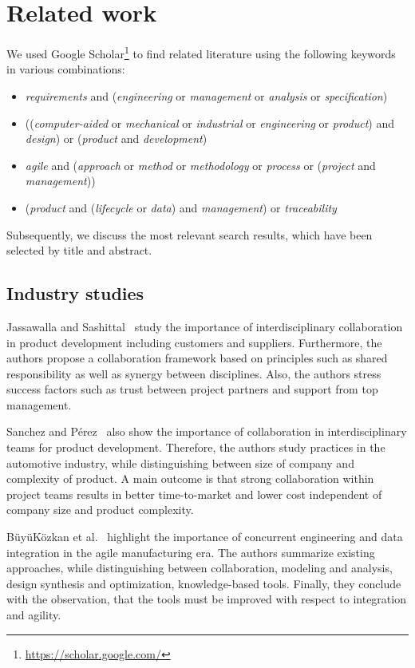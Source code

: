     \section{Related work}
    \label{sec:differentiation}
    We used Google Scholar\footnote{\url{https://scholar.google.com/}} to find related literature using the following keywords in various combinations:
    \begin{itemize}
        \item \textit{requirements} and (\textit{engineering} or \textit{management} or \textit{analysis} or \textit{specification})
        \item ((\textit{computer-aided} or \textit{mechanical} or \textit{industrial} or \textit{engineering} or \textit{product}) and \textit{design}) or (\textit{product} and \textit{development})
        \item \textit{agile} and (\textit{approach} or \textit{method} or \textit{methodology} or \textit{process} or (\textit{project} and \textit{management}))
        \item (\textit{product} and (\textit{lifecycle} or \textit{data}) and \textit{management}) or \textit{traceability}
    \end{itemize}
    Subsequently, we discuss the most relevant search results, which have been selected by title and abstract.
    
    \subsection*{Industry studies}
    Jassawalla and Sashittal~\cite{Jassawalla} study the importance of interdisciplinary collaboration in product development including customers and suppliers.
    Furthermore, the authors propose a collaboration framework based on principles such as shared responsibility as well as synergy between disciplines.
    Also, the authors stress success factors such as trust between project partners and support from top management.

    Sanchez and P{\'e}rez~\cite{sanchez2003flexibility} also show the importance of collaboration in interdisciplinary teams for product development.
    Therefore, the authors study practices in the automotive industry, while distinguishing between size of company and complexity of product.
    A main outcome is that strong collaboration within project teams results in better time-to-market and lower cost independent of company size and product complexity.
    
    B{\"u}y{\"u}K{\"o}zkan et al.~\cite{buyukozkan2004survey} highlight the importance of concurrent engineering and data integration in the agile manufacturing era.
    The authors summarize existing approaches, while distinguishing between collaboration, modeling and analysis, design synthesis and optimization, knowledge-based tools.
    Finally, they conclude with the observation, that the tools must be improved with respect to integration and agility.
    
